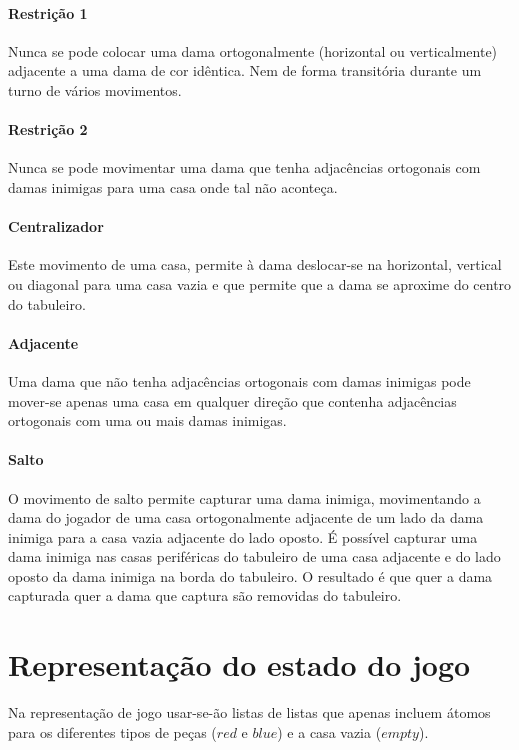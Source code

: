 \documentclass[a4paper,11pt,titlepage]{article}
\begin{document}
\paragraph{Restrição 1}
Nunca se pode colocar uma dama ortogonalmente (horizontal ou verticalmente) adjacente a uma dama de cor idêntica. Nem de forma transitória durante um turno de vários movimentos.

\paragraph{Restrição 2}
Nunca se pode movimentar uma dama que tenha adjacências ortogonais com damas inimigas para uma casa onde tal não aconteça.

\paragraph{Centralizador}
Este movimento de uma casa, permite à dama deslocar-se na horizontal, vertical ou diagonal para uma casa vazia e que permite que a dama se aproxime do centro do tabuleiro.


\paragraph{Adjacente}
Uma dama que não tenha adjacências ortogonais com damas inimigas pode mover-se apenas uma casa em qualquer direção que contenha adjacências ortogonais com uma ou mais damas inimigas.

\paragraph{Salto}
O movimento de salto permite capturar uma dama inimiga, movimentando a dama do jogador de uma casa ortogonalmente adjacente de um lado da dama inimiga para a casa vazia adjacente do lado oposto. É possível capturar uma dama inimiga nas casas periféricas do tabuleiro de uma casa adjacente e do lado oposto da dama inimiga na borda do tabuleiro. O resultado é que quer a dama capturada quer a dama que captura são removidas do tabuleiro.

\section{Representação do estado do jogo}

Na representação de jogo usar-se-ão listas de listas que apenas incluem
átomos para os diferentes tipos de peças ($red$ e $blue$) e a casa vazia ($empty$).
\end{document}
